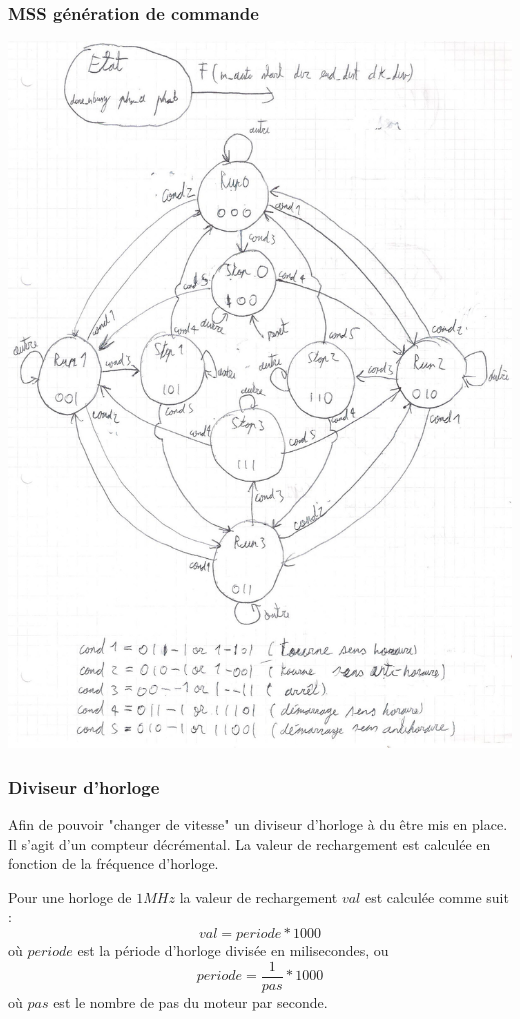 \documentclass[10pt,a4paper]{article}
\begin{document}
\subsubsection{MSS génération de commande}
\includegraphics[scale=0.5]{images/mss.jpg}
\subsubsection{Diviseur d'horloge}
Afin de pouvoir "changer de vitesse" un diviseur d'horloge à du être mis en place.
Il s'agit d'un compteur décrémental.
La valeur de rechargement est calculée en fonction de la fréquence d'horloge.

Pour une horloge de $1MHz$ la valeur de rechargement $val$ est calculée comme suit :
\begin{equation}
val = periode * 1000
\end{equation}
où $periode$ est la période d'horloge divisée en milisecondes, ou
\begin{equation}
periode = \frac{1}{pas} * 1000
\end{equation} 
où $pas$ est le nombre de pas du moteur par seconde.
\end{document}
